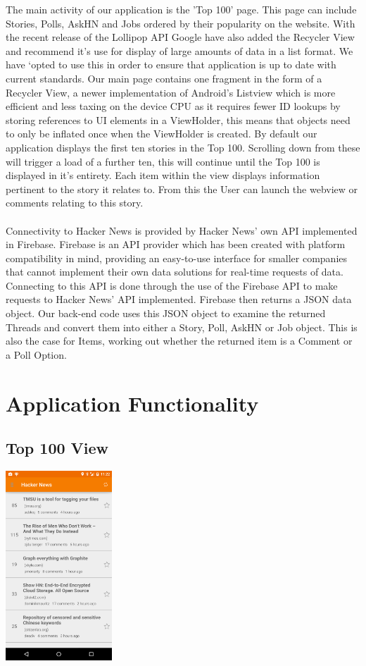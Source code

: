 \documentclass[11pt]{article}
\begin{document}
The main activity of our application is the 'Top 100' page. This page can include Stories, Polls, AskHN and Jobs ordered by their popularity on the website. With the recent release of the Lollipop API Google have also added the Recycler View and recommend it's use for display of large amounts of data in a list format. We have ‘opted to use this in order to ensure that application is up to date with current standards. Our main page contains one fragment in the form of a Recycler View, a newer implementation of Android's Listview which is more efficient and less taxing on the device CPU as it requires  fewer ID lookups by storing references to UI elements in a ViewHolder, this means that objects need to only be inflated once when the ViewHolder is created. By default our application displays the first ten stories in the Top 100. Scrolling down from these will trigger a load of a further ten, this will continue until the Top 100 is displayed in it's entirety. Each item within the view displays information pertinent to the story it relates to. From this the User can launch the webview or comments relating to this story.
\\
\\
Connectivity to Hacker News is provided by Hacker News' own API implemented in Firebase. Firebase is an API provider which has been created with platform compatibility in mind, providing an easy-to-use interface for smaller companies that cannot implement their own data solutions for real-time requests of data. Connecting to this API is done through the use of the Firebase API to make requests to Hacker News' API implemented. Firebase then returns a JSON data object. Our back-end code uses this JSON object to examine the returned Threads and convert them into either a Story, Poll, AskHN or Job object. This is also the case for Items, working out whether the returned item is a Comment or a Poll Option.

\section*{Application Functionality}

\subsection*{Top 100 View}
\begin{center}
\includegraphics[width=0.3\textwidth]{threadView.png}
\end{center}
\end{document}

